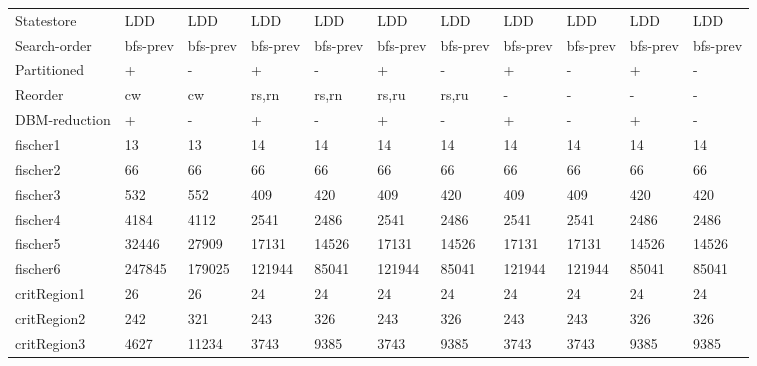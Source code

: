 \begin{table}
\label{fig:nodes_3}
\begin{adjustbox}{max totalheight=\textheight}
    \begin{tabular}{|l|llllllllll|}
    \hline
     Statestore        & LDD      & LDD      & LDD      & LDD      & LDD      & LDD      & LDD      & LDD      & LDD      & LDD      \\
    Search-order       & bfs-prev & bfs-prev & bfs-prev & bfs-prev & bfs-prev & bfs-prev & bfs-prev & bfs-prev & bfs-prev & bfs-prev \\
    Partitioned        & +        & -        & +        & -        & +        & -        & +        & -        & +        & -        \\
    Reorder            & cw       & cw       & rs,rn    & rs,rn    & rs,ru    & rs,ru    & -        & -        & -        & -        \\
    DBM-reduction      & +        & -        & +        & -        & +        & -        & +        & -        & +        & -        \\ \hline
    fischer1           & 13       & 13       & 14       & 14       & 14       & 14       & 14       & 14       & 14       & 14       \\
    fischer2           & 66       & 66       & 66       & 66       & 66       & 66       & 66       & 66       & 66       & 66       \\
    fischer3           & 532      & 552      & 409      & 420      & 409      & 420      & 409      & 409      & 420      & 420      \\
    fischer4           & 4184     & 4112     & 2541     & 2486     & 2541     & 2486     & 2541     & 2541     & 2486     & 2486     \\
    fischer5           & 32446    & 27909    & 17131    & 14526    & 17131    & 14526    & 17131    & 17131    & 14526    & 14526    \\
    fischer6           & 247845   & 179025   & 121944   & 85041    & 121944   & 85041    & 121944   & 121944   & 85041    & 85041    \\ \hline
    critRegion1        & 26       & 26       & 24       & 24       & 24       & 24       & 24       & 24       & 24       & 24       \\
    critRegion2        & 242      & 321      & 243      & 326      & 243      & 326      & 243      & 243      & 326      & 326      \\
    critRegion3        & 4627     & 11234    & 3743     & 9385     & 3743     & 9385     & 3743     & 3743     & 9385     & 9385     \\

\end{tabular}
\end{adjustbox}
\end{table}

